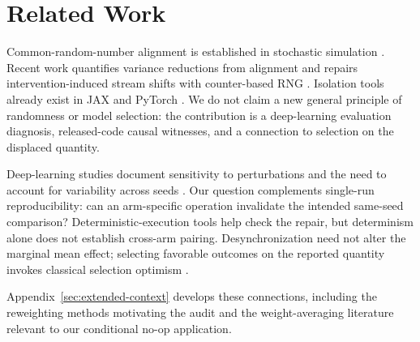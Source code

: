 \section{Related Work}

Common-random-number alignment is established in stochastic simulation
\citep{glasserman1992crn,stout2008keeping,pearce2022bayesian}.
Recent work quantifies variance reductions from alignment
\citep{klein2024noisefree} and repairs intervention-induced stream shifts
with counter-based RNG \citep{buffalo2026realizing}. Isolation tools already
exist in JAX and PyTorch \citep{jax2018prng,pytorch_forkrng}.
We do not claim a new general principle of randomness or model selection:
the contribution is a deep-learning evaluation diagnosis, released-code
causal witnesses, and a connection to selection on the displaced quantity.

Deep-learning studies document sensitivity to perturbations and the need
to account for variability across seeds
\citep{summers2021nondeterminism,dodge2020finetuning,bouthillier2021accounting}.
Our question complements single-run reproducibility: can an arm-specific
operation invalidate the intended same-seed comparison?
Deterministic-execution tools
\citep{chen2022reproducible,heumos2023mlfcore,shkolnikov2026bitidentical}
help check the repair, but determinism alone does not establish cross-arm
pairing. Desynchronization need not alter the marginal mean effect; selecting
favorable outcomes on the reported quantity invokes classical selection
optimism \citep{cawley2010overfitting}.

Appendix~\ref{sec:extended-context} develops these connections, including
the reweighting methods motivating the audit and the weight-averaging
literature relevant to our conditional no-op application.
